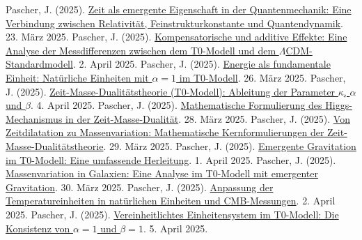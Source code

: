\documentclass[12pt,a4paper]{article}
\begin{document}
	\begin{thebibliography}{99}
		 Pascher, J. (2025). \href{https://github.com/jpascher/T0-Time-Mass-Duality/tree/main/2/pdf/Deutsch/NatEinheitenAlpha1.pdf}{Zeit als emergente Eigenschaft in der Quantenmechanik: Eine Verbindung zwischen Relativität, Feinstrukturkonstante und Quantendynamik}. 23. März 2025.
		 Pascher, J. (2025). \href{https://github.com/jpascher/T0-Time-Mass-Duality/tree/main/2/pdf/Deutsch/MessdifferenzenT0Standard.pdf}{Kompensatorische und additive Effekte: Eine Analyse der Messdifferenzen zwischen dem T0-Modell und dem \(\Lambda\)CDM-Standardmodell}. 2. April 2025.
		 Pascher, J. (2025). \href{https://github.com/jpascher/T0-Time-Mass-Duality/tree/main/2/pdf/Deutsch/NatEinheitenAlpha1.pdf}{Energie als fundamentale Einheit: Natürliche Einheiten mit \(\alpha = 1\) im T0-Modell}. 26. März 2025.
		 Pascher, J. (2025). \href{https://github.com/jpascher/T0-Time-Mass-Duality/tree/main/2/pdf/Deutsch/ZeitMasseT0Params.pdf}{Zeit-Masse-Dualitätstheorie (T0-Modell): Ableitung der Parameter \(\kappa\), \(\alpha\) und \(\beta\)}. 4. April 2025.
		 Pascher, J. (2025). \href{https://github.com/jpascher/T0-Time-Mass-Duality/tree/main/2/pdf/Deutsch/MathHiggsZeitMasse.pdf}{Mathematische Formulierung des Higgs-Mechanismus in der Zeit-Masse-Dualität}. 28. März 2025.
		 Pascher, J. (2025). \href{https://github.com/jpascher/T0-Time-Mass-Duality/tree/main/2/pdf/Deutsch/MathZeitMasseLagrange.pdf}{Von Zeitdilatation zu Massenvariation: Mathematische Kernformulierungen der Zeit-Masse-Dualitätstheorie}. 29. März 2025.
		 Pascher, J. (2025). \href{https://github.com/jpascher/T0-Time-Mass-Duality/tree/main/2/pdf/Deutsch/EmergentGravT0.pdf}{Emergente Gravitation im T0-Modell: Eine umfassende Herleitung}. 1. April 2025.
		 Pascher, J. (2025). \href{https://github.com/jpascher/T0-Time-Mass-Duality/tree/main/2/pdf/Deutsch/MassVarGalaxien.pdf}{Massenvariation in Galaxien: Eine Analyse im T0-Modell mit emergenter Gravitation}. 30. März 2025.
		 Pascher, J. (2025). \href{https://github.com/jpascher/T0-Time-Mass-Duality/tree/main/2/pdf/Deutsch/NatEinheitenAlpha1.pdf}{Anpassung der Temperatureinheiten in natürlichen Einheiten und CMB-Messungen}. 2. April 2025.
		 Pascher, J. (2025). \href{https://github.com/jpascher/T0-Time-Mass-Duality/tree/main/2/pdf/Deutsch/Alpha1Beta1Konsistenz.pdf}{Vereinheitlichtes Einheitensystem im T0-Modell: Die Konsistenz von \(\alpha = 1\) und \(\beta = 1\)}. 5. April 2025.

\end{thebibliography}
\end{document}
